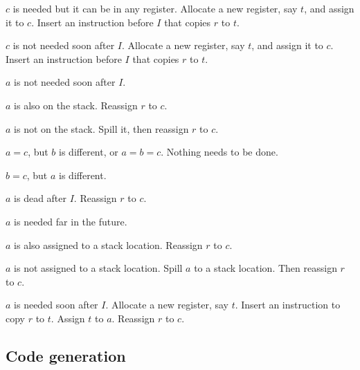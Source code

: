\begin{legal}
\begin{legal}
\begin{legal}
\begin{legal}
\begin{legal}
\begin{legal}
\begin{legal}
\begin{legal}
\begin{legal}
                \end{legal}
              \end{legal}
            \end{legal}
          \end{legal}
        \item $c$ is needed but it can be in any register.  Allocate
          a new register, say $t$, and assign it to $c$.  Insert an
          instruction before $I$ that copies $r$ to $t$.
        \end{legal}
      \item $c$ is not needed soon after $I$.  Allocate a new
        register, say $t$, and assign it to $c$.  Insert an
        instruction before $I$ that copies $r$ to $t$.
      \end{legal}
    \item $a$ is not needed soon after $I$.
      \begin{legal}
      \item $a$ is also on the stack.  Reassign $r$ to $c$.
      \item $a$ is not on the stack.  Spill it, then reassign $r$ to
        $c$.
      \end{legal}
    \end{legal}
  \end{legal}
\item $a = c$, but $b$ is different, or $a = b = c$. Nothing needs to
  be done.
\item $b = c$, but $a$ is different.
  \begin{legal}
  \item $a$ is dead after $I$.  Reassign $r$ to $c$.
  \item $a$ is needed far in the future.
    \begin{legal}
    \item $a$ is also assigned to a stack location.  Reassign $r$ to $c$.
    \item $a$ is not assigned to a stack location.  Spill $a$ to a
      stack location.  Then reassign $r$ to $c$.
    \end{legal}
  \item $a$ is needed soon after $I$.  Allocate a new register, say
    $t$.  Insert an instruction to copy $r$ to $t$.  Assign $t$ to
    $a$.  Reassign $r$ to $c$.
  \end{legal}
\end{legal}

\subsection{Code generation}

